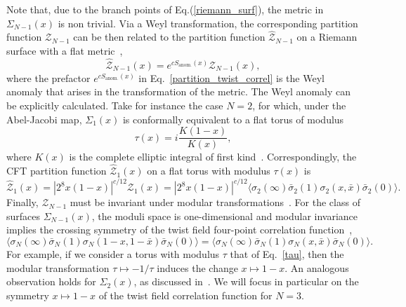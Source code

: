 \documentclass[a4paper,11pt]{article}
\begin{document}
Note that, due to the branch points of Eq.(\ref{riemann_surf}), the metric in $\Sigma_{N-1}(x)$ is non trivial.  Via a Weyl transformation, the corresponding partition function $\mathcal{Z}_{N-1}$ can be then related to the partition function $\mathcal{\hat{Z}}_{N-1}$ on a Riemann surface with a flat metric~\cite{Lunin},  
\begin{equation}\label{partition_twist_correl}
 \mathcal{\hat{Z}}_{N-1}(x)=e^{cS_{\text{anom.}}(x)} \mathcal{Z}_{N-1}(x),
\end{equation}
where the prefactor $e^{cS_{\text{anom.}}(x)}$ in Eq.~\eqref{partition_twist_correl} is the Weyl anomaly that arises in the 
transformation of the metric.
\noindent The Weyl anomaly can be explicitly calculated. Take for instance the case $N=2$, for which, under the Abel-Jacobi map, $\Sigma_{1}(x)$ is conformally equivalent to a flat torus of modulus 
\begin{equation}\label{tau}
 \tau(x)=i\frac{K(1-x)}{K(x)}, 
\end{equation}
where $K(x)$ is the complete elliptic integral of first 
kind~\cite{Whittaker}. Correspondingly, the CFT partition function $\mathcal{\hat{Z}}_1(x)$ on a flat torus 
with modulus $\tau(x)$ is~\cite{Lunin}
\begin{equation}\label{partition_torus_twist}
 \mathcal{\hat{Z}}_1(x)=|2^8 x(1-x)|^{c/12} \mathcal{Z}_{1}(x)
 =|2^8 x(1-x)|^{c/12} \langle \sigma_2 (\infty)\bar{\sigma}_2(1)\sigma_2(x, \bar{x})\bar{\sigma}_2(0)\rangle.
\end{equation}
Finally, $\mathcal{Z}_{N-1}$ must be invariant  
under modular transformations~\cite{CardyMod, Cappelli, Cappelli2}.  For the class of surfaces $\Sigma_{N-1}(x)$, the moduli space is one-dimensional and modular invariance implies the crossing
symmetry of the twist field four-point correlation function~\cite{Cardy},
\begin{equation}\label{cross_symmetry}
 \langle \sigma_N(\infty)\bar{\sigma}_N(1)\sigma_N(1-x, 1-\bar{x})\bar{\sigma}_N(0)\rangle=
 \langle \sigma_N(\infty)\bar{\sigma}_N(1)\sigma_N(x, \bar{x})\bar{\sigma}_N(0)\rangle. 
\end{equation}
For example, if we consider a torus with modulus $\tau$ that of Eq.~\eqref{tau},
then the modular transformation $\tau\mapsto-1/\tau$ induces the change
$x\mapsto 1-x$. An analogous observation holds for $\Sigma_{2}(x)$, as discussed in~\cite{Cardy}.
 We will focus in particular on 
the symmetry $x\mapsto 1-x$ of the twist field correlation function for $N=3$. 
\end{document}
